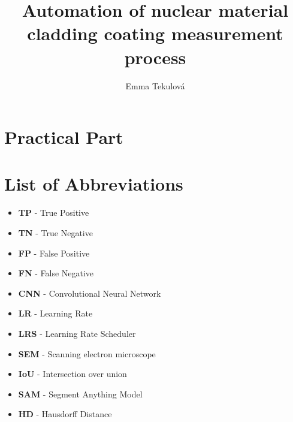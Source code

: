 \documentclass[12pt,a4paper]{report}
\title{Automation of nuclear material cladding coating measurement process}
\author{Emma Tekulová}
\newcommand{\vskipbefore}{\vspace{-2cm}} %
\begin{document}
\maketitle
\newpage

\vskipbefore %


\renewcommand{\contentsname}{\vspace{-1.5cm}Contents}
\tableofcontents

\newpage




\chapter{Practical Part}











\newpage
\vskipbefore %
\listoffigures

\newpage

\vskipbefore %
\listoftables

\newpage

\chapter*{List of Abbreviations}
\begin{itemize}
    \item \textbf{TP} - True Positive
    \item \textbf{TN} - True Negative
    \item \textbf{FP} - False Positive
    \item \textbf{FN} - False Negative
    \item \textbf{CNN} - Convolutional Neural Network
    \item \textbf{LR} - Learning Rate
    \item \textbf{LRS} - Learning Rate Scheduler
    \item \textbf{SEM} - Scanning electron microscope
    \item \textbf{IoU} - Intersection over union
    \item \textbf{SAM} - Segment Anything Model
    \item \textbf{HD} - Hausdorff Distance
    
\end{itemize}
\end{document}
